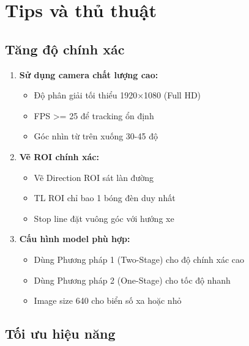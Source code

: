 \section{Tips và thủ thuật}

\subsection{Tăng độ chính xác}

\begin{enumerate}
    \item \textbf{Sử dụng camera chất lượng cao:}
    \begin{itemize}
        \item Độ phân giải tối thiểu 1920×1080 (Full HD)
        \item FPS >= 25 để tracking ổn định
        \item Góc nhìn từ trên xuống 30-45 độ
    \end{itemize}
    
    \item \textbf{Vẽ ROI chính xác:}
    \begin{itemize}
        \item Vẽ Direction ROI sát làn đường
        \item TL ROI chỉ bao 1 bóng đèn duy nhất
        \item Stop line đặt vuông góc với hướng xe
    \end{itemize}
    
    \item \textbf{Cấu hình model phù hợp:}
    \begin{itemize}
        \item Dùng Phương pháp 1 (Two-Stage) cho độ chính xác cao
        \item Dùng Phương pháp 2 (One-Stage) cho tốc độ nhanh
        \item Image size 640 cho biển số xa hoặc nhỏ
    \end{itemize}
\end{enumerate}

\subsection{Tối ưu hiệu năng}

